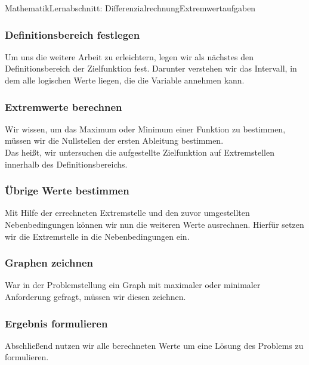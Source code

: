 \documentclass[11pt,twocolumn,oneside,openany,headings=optiontotoc,11pt,numbers=noenddot]{article}
\begin{document}
\begin{worksheet}{Mathematik}{Lernabschnitt: Differenzialrechnung}{Extremwertaufgaben}
		\subsubsection*{Definitionsbereich festlegen}
		Um uns die weitere Arbeit zu erleichtern, legen wir als nächstes den Definitionsbereich der Zielfunktion fest. Darunter verstehen wir das Intervall, in dem alle logischen Werte liegen, die die Variable annehmen kann.
		\subsubsection*{Extremwerte berechnen}
		Wir wissen, um das Maximum oder Minimum einer Funktion zu bestimmen, müssen wir die Nullstellen der ersten Ableitung bestimmen.\\
		Das heißt, wir untersuchen die aufgestellte Zielfunktion auf Extremstellen innerhalb des Definitionsbereichs.
		\subsubsection*{Übrige Werte bestimmen}
		Mit Hilfe der errechneten Extremstelle und den zuvor umgestellten Nebenbedingungen können wir nun die weiteren Werte ausrechnen. Hierfür setzen wir die Extremstelle in die Nebenbedingungen ein.
		\subsubsection*{Graphen zeichnen}
		War in der Problemstellung ein Graph mit maximaler oder minimaler Anforderung gefragt, müssen wir diesen zeichnen.
		\subsubsection*{Ergebnis formulieren}
		Abschließend nutzen wir alle berechneten Werte um eine Lösung des Problems zu formulieren.

\end{worksheet}
\end{document}
